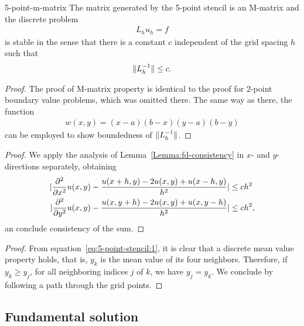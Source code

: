 \begin{Theorem}{5-point-m-matrix}
  The matrix generated by the 5-point stencil is an M-matrix and the
  discrete problem
  \begin{gather*}
    L_h u_h = f
  \end{gather*}
  is stable in the sense that there is a constant $c$ independent of
  the grid spacing $h$ such that
  \begin{gather*}
    \lVert L_h^{-1}\rVert \le c.
  \end{gather*}
\end{Theorem}

\begin{proof}
  The proof of M-matrix property is identical to the proof for 2-point
  boundary value problems, which was omitted there.  The same way as
  there, the function
  \begin{gather*}
    w(x,y) = (x-a)(b-x)(y-a)(b-y)
  \end{gather*}
  can be employed to show boundedness of $\lVert L_h^{-1}\rVert$.
\end{proof}



\begin{proof}
  We apply the analysis of Lemma~\ref{Lemma:fd-consistency} in $x$-
  and $y$-directions separately, obtaining
  \begin{align*}
    \lvert\frac{\partial^2}{\partial x^2} u(x,y)
      - \frac{u(x+h,y) -2u(x,y) + u(x-h,y)}{h^2}\rvert & \le c h^2 \\
    \lvert\frac{\partial^2}{\partial y^2} u(x,y)
      - \frac{u(x,y+h) -2u(x,y) + u(x,y-h)}{h^2}\rvert & \le c h^2,
  \end{align*}
  an conclude consistency of the sum.
\end{proof}



\begin{proof}
  From equation~\eqref{eq:5-point-stencil:1}, it is clear that a
  discrete mean value property holds, that is, $y_k$ is the mean value
  of its four neighbors. Therefore, if $y_k \ge y_j$, for all
  neighboring indices $j$ of $k$, we have $y_j = y_k$. We conclude by
  following a path through the grid points.
\end{proof}

\subsection{Fundamental solution}

